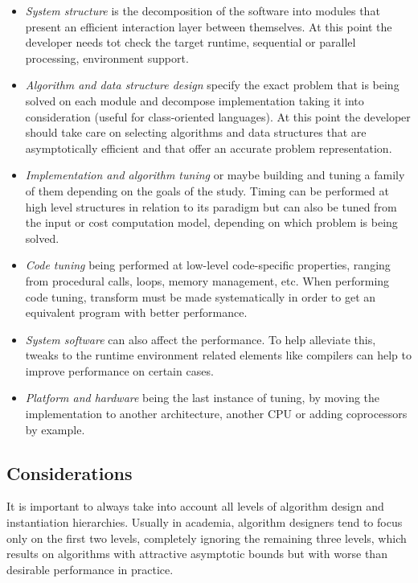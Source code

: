 \begin{itemize}
    \item \textit{System structure} is the decomposition of the software into modules that present an efficient interaction layer between themselves. At this point the developer needs tot check the target runtime, sequential or parallel processing, environment support.
    \item \textit{Algorithm and data structure design} specify the exact problem that is being solved on each module and decompose implementation taking it into consideration (useful for class-oriented languages). At this point the developer should take care on selecting algorithms and data structures that are asymptotically efficient and that offer an accurate problem representation.
    \item \textit{Implementation and algorithm tuning} or maybe building and tuning a family of them depending on the goals of the study. Timing can be performed  at high level structures in relation to its paradigm but can also be tuned from the input or cost computation model, depending on which problem is being solved.
    \item \textit{Code tuning} being performed at low-level code-specific properties, ranging from procedural calls, loops, memory management, etc. When performing code tuning, transform must be made systematically in order to get an equivalent program with better performance.
    \item \textit{System software} can also affect the performance. To help alleviate this, tweaks to the runtime environment related elements like compilers can help to improve performance on certain cases.
    \item \textit{Platform and hardware} being the last instance of tuning, by moving the implementation to another architecture, another CPU or adding coprocessors by example.
\end{itemize}

\subsection{Considerations}
\label{SUBSECTION:EXPERIMENTAL_ALGORITMICS_CONSIDERATIONS}
It is important to always take into account all levels of algorithm design and instantiation hierarchies. Usually in academia, algorithm designers tend to focus only on the first two levels, completely ignoring the remaining three levels, which results on algorithms with attractive asymptotic bounds but with worse than desirable performance in practice. 

